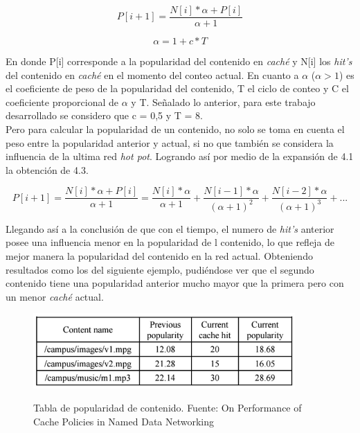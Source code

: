 \documentclass[12pt]{ociamthesis}  %
\begin{document}
\begin{equation}
P[i+1] = \frac{N[i]*\alpha+P[i]}{\alpha+1}
\end{equation}

\begin{equation}
\alpha=1+c*T
\end{equation}

En donde P[i] corresponde a la popularidad del contenido en \textit{caché} y N[i] los \textit{hit's} del contenido en \textit{caché} en el momento del conteo actual. En cuanto a $\alpha$ ($\alpha>1$) es el coeficiente de peso de la popularidad del contenido, T el ciclo de conteo y C el coeficiente proporcional de $\alpha$ y T. Señalado lo anterior, para este trabajo desarrollado se considero que c = 0,5 y T = 8.\\

Pero para calcular la popularidad de un contenido, no solo se toma en cuenta el peso entre la popularidad anterior y actual, si no que también se considera la influencia de la ultima red \textit{hot pot}. Logrando así por medio de la expansión de 4.1 la obtención de 4.3.

\begin{equation}
P[i+1] = \frac{N[i]*\alpha+P[i]}{\alpha+1}
	   = \frac{N[i]*\alpha}{\alpha+1} + \frac{N[i-1]*\alpha}{(\alpha+1)^2} + \frac{N[i-2]*\alpha}{(\alpha+1)^3} + ...
\end{equation}

Llegando así a la conclusión de que con el tiempo, el numero de \textit{hit's} anterior posee una influencia menor en la popularidad de l contenido, lo que refleja de mejor manera la popularidad del contenido en la red actual. Obteniendo resultados como los del siguiente ejemplo, pudiéndose ver que el segundo contenido tiene una popularidad anterior mucho mayor que la primera pero con un menor \textit{caché} actual.

\begin{figure}[!htb]
	\centering
	\includegraphics[width=10cm]{Imagenes/Paper1.1/TablaPopularidadContenido}\\
	\caption{Tabla de popularidad de contenido. Fuente: On Performance of Cache Policies in Named Data Networking \cite{ran2013performance}}
	\label{tabla_popularidad_contenido}
\end{figure}
\end{document}
